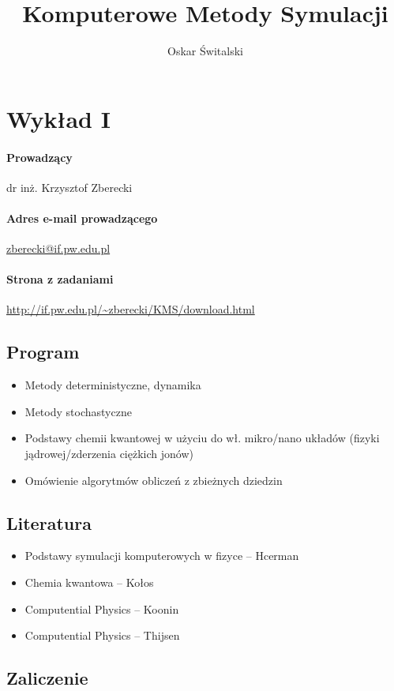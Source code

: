 \documentclass[a4paper,10pt]{article}
\title{Komputerowe Metody Symulacji}
\author{Oskar Świtalski}
\begin{document}
\maketitle

\section{Wykład I} %
\paragraph{Prowadzący} dr inż. Krzysztof Zberecki
\paragraph{Adres e-mail prowadzącego} \href{mailto:zberecki@if.pw.edu.pl}{zberecki@if.pw.edu.pl}
\paragraph{Strona z zadaniami} \url{http://if.pw.edu.pl/~zberecki/KMS/download.html}

\subsection{Program}
\begin{itemize}
 \item Metody deterministyczne, dynamika 
 \item Metody stochastyczne
 \item Podstawy chemii kwantowej w użyciu do  wł. mikro/nano układów (fizyki jądrowej/zderzenia ciężkich jonów)
 \item Omówienie algorytmów obliczeń z zbieżnych dziedzin
\end{itemize}


\subsection{Literatura}
\begin{itemize}
\item Podstawy symulacji komputerowych w fizyce – Hcerman
\item Chemia kwantowa – Kołos
\item Computential Physics – Koonin 
\item Computential Physics – Thijsen
\end{itemize}

\subsection{Zaliczenie}
\end{document}
